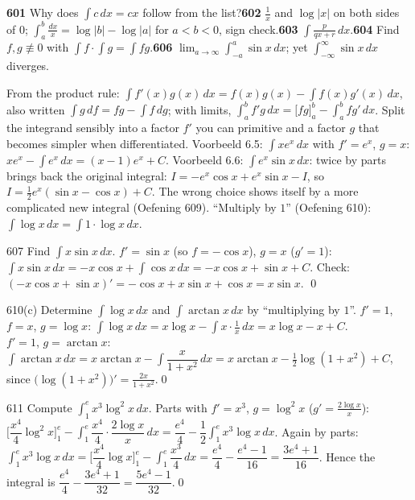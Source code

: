 \begin{trybox}[{601, 602, 603, 604, 606}]
\textbf{601} Why does $\int c\,dx=cx$ follow from the list?\quad \textbf{602} $\frac1x$ and $\log|x|$ on both sides of $0$; $\int_a^b\frac{dx}x=\log|b|-\log|a|$ for $a<b<0$, sign check.\quad \textbf{603} $\int\frac{p}{qx+r}\,dx$.\quad \textbf{604} Find $f,g\not\equiv0$ with $\int f\cdot\int g=\int fg$.\quad \textbf{606} $\lim_{a\to\infty}\int_{-a}^a\sin x\,dx$; yet $\int_{-\infty}^\infty\sin x\,dx$ diverges.
\end{trybox}

\begin{key}
From the product rule: $\displaystyle\int f'(x)g(x)\,dx=f(x)g(x)-\int f(x)g'(x)\,dx$, also written $\int g\,df=fg-\int f\,dg$; with limits, $\int_a^bf'g\,dx=\big[fg\big]_a^b-\int_a^bfg'\,dx$. Split the integrand sensibly into a factor $f'$ you can primitive and a factor $g$ that becomes simpler when differentiated. Voorbeeld 6.5: $\int xe^x\,dx$ with $f'=e^x$, $g=x$: $xe^x-\int e^x\,dx=(x-1)e^x+C$. Voorbeeld 6.6: $\int e^x\sin x\,dx$: twice by parts brings back the original integral: $I=-e^x\cos x+e^x\sin x-I$, so $I=\frac12e^x(\sin x-\cos x)+C$. The wrong choice shows itself by a more complicated new integral (Oefening 609). ``Multiply by $1$'' (Oefening 610): $\int\log x\,dx=\int1\cdot\log x\,dx$.
\end{key}

\begin{bookex}{607}
Find $\int x\sin x\,dx$.
\solution
$f'=\sin x$ (so $f=-\cos x$), $g=x$ ($g'=1$): $\int x\sin x\,dx=-x\cos x+\int\cos x\,dx=-x\cos x+\sin x+C$. Check: $(-x\cos x+\sin x)'=-\cos x+x\sin x+\cos x=x\sin x$. \checkmark\qed
\end{bookex}

\begin{bookex}{610(c)}
Determine $\int\log x\,dx$ and $\int\arctan x\,dx$ by ``multiplying by $1$''.
\solution
$f'=1$, $f=x$, $g=\log x$: $\int\log x\,dx=x\log x-\int x\cdot\frac1x\,dx=x\log x-x+C$.\\
$f'=1$, $g=\arctan x$: $\int\arctan x\,dx=x\arctan x-\int\dfrac x{1+x^2}\,dx=x\arctan x-\tfrac12\log(1+x^2)+C$, since $\big(\log(1+x^2)\big)'=\frac{2x}{1+x^2}$.\qed
\end{bookex}

\begin{bookex}{611}
Compute $\int_1^ex^3\log^2x\,dx$.
\solution
Parts with $f'=x^3$, $g=\log^2x$ ($g'=\frac{2\log x}x$): $\Big[\dfrac{x^4}4\log^2x\Big]_1^e-\int_1^e\dfrac{x^4}4\cdot\dfrac{2\log x}x\,dx=\dfrac{e^4}4-\dfrac12\int_1^ex^3\log x\,dx$. Again by parts: $\int_1^ex^3\log x\,dx=\Big[\dfrac{x^4}4\log x\Big]_1^e-\int_1^e\dfrac{x^3}4\,dx=\dfrac{e^4}4-\dfrac{e^4-1}{16}=\dfrac{3e^4+1}{16}$. Hence the integral is $\dfrac{e^4}4-\dfrac{3e^4+1}{32}=\dfrac{5e^4-1}{32}$.\qed
\end{bookex}

